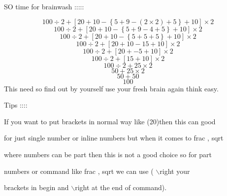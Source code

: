 \documentclass[11pt]{article}
\begin{document}
SO time for brainwash :::::

$$100\div2+\left[ 20+10-\left\{5+9-\left(2\times2\right)+5\right\}+10\right]\times2$$
$$100\div2+\left[ 20+10-\left\{5+9-4+5\right\}+10\right]\times2$$
$$100\div2+\left[ 20+10-\left\{5+5+5\right\}+10\right]\times2$$
$$100\div2+\left[ 20+10-15+10\right]\times2$$
$$100\div2+\left[ 20+-5+10\right]\times2$$
$$100\div2+\left[ 15+10\right]\times2$$
$$100\div2+25\times2$$
$$50+25\times2$$
$$50+50$$
$$100$$
This need so find out by yourself use your fresh brain again think easy.
\vspace{1cm}

Tips ::::

If you want to put brackets in normal way like (20)then this can good 

for just single number or inline numbers but when it comes to frac , sqrt 

where numbers can be part then this is not a good choice so for part 

numbers or command like frac , sqrt we can use ( $\backslash$right your 

brackets in begin and $\backslash$right at the end of command).
\end{document}
